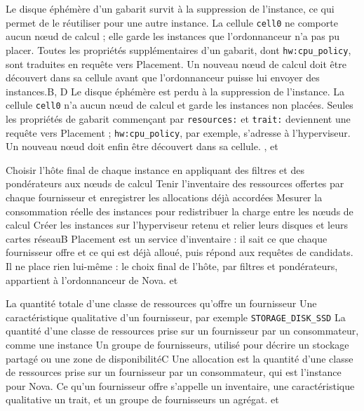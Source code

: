   {Le disque éphémère d'un gabarit survit à la suppression de l'instance, ce qui permet de le réutiliser pour une autre instance.}
  {La cellule \texttt{cell0} ne comporte aucun nœud de calcul ; elle garde les instances que l'ordonnanceur n'a pas pu placer.}
  {Toutes les propriétés supplémentaires d'un gabarit, dont \texttt{hw:cpu\_policy}, sont traduites en requête vers Placement.}
  {Un nouveau nœud de calcul doit être découvert dans sa cellule avant que l'ordonnanceur puisse lui envoyer des instances.}{B, D}
  {Le disque éphémère est perdu à la suppression de l'instance. La cellule \texttt{cell0} n'a aucun nœud de calcul et garde les instances non placées. Seules les propriétés de gabarit commençant par \texttt{resources:} et \texttt{trait:} deviennent une requête vers Placement ; \texttt{hw:cpu\_policy}, par exemple, s'adresse à l'hyperviseur. Un nouveau nœud doit enfin être découvert dans sa cellule.}
  {,  et }


  {Choisir l'hôte final de chaque instance en appliquant des filtres et des pondérateurs aux nœuds de calcul}
  {Tenir l'inventaire des ressources offertes par chaque fournisseur et enregistrer les allocations déjà accordées}
  {Mesurer la consommation réelle des instances pour redistribuer la charge entre les nœuds de calcul}
  {Créer les instances sur l'hyperviseur retenu et relier leurs disques et leurs cartes réseau}{B}
  {Placement est un service d'inventaire : il sait ce que chaque fournisseur offre et ce qui est déjà alloué, puis répond aux requêtes de candidats. Il ne place rien lui-même : le choix final de l'hôte, par filtres et pondérateurs, appartient à l'ordonnanceur de Nova.}
  { et }

  {La quantité totale d'une classe de ressources qu'offre un fournisseur}
  {Une caractéristique qualitative d'un fournisseur, par exemple \texttt{STORAGE\_DISK\_SSD}}
  {La quantité d'une classe de ressources prise sur un fournisseur par un consommateur, comme une instance}
  {Un groupe de fournisseurs, utilisé pour décrire un stockage partagé ou une zone de disponibilité}{C}
  {Une allocation est la quantité d'une classe de ressources prise sur un fournisseur par un consommateur, qui est l'instance pour Nova. Ce qu'un fournisseur offre s'appelle un inventaire, une caractéristique qualitative un trait, et un groupe de fournisseurs un agrégat.}
  { et }

